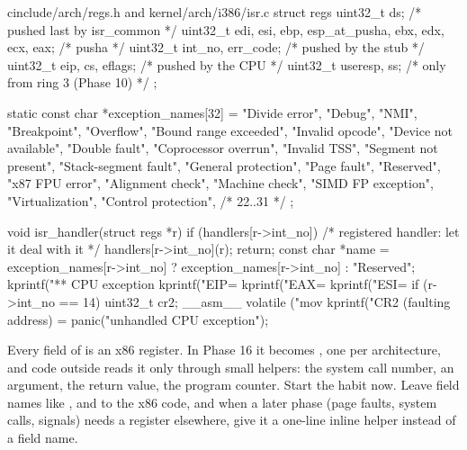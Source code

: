 \documentclass[11pt,a4paper]{article}
\begin{document}
\begin{lst}{c}{include/arch/regs.h and kernel/arch/i386/isr.c}
struct regs {
    uint32_t ds;                                        /* pushed last by isr_common */
    uint32_t edi, esi, ebp, esp_at_pusha, ebx, edx, ecx, eax;   /* pusha */
    uint32_t int_no, err_code;                          /* pushed by the stub        */
    uint32_t eip, cs, eflags;                           /* pushed by the CPU         */
    uint32_t useresp, ss;                               /* only from ring 3 (Phase 10) */
};

static const char *exception_names[32] = {
    "Divide error", "Debug", "NMI", "Breakpoint", "Overflow", "Bound range exceeded",
    "Invalid opcode", "Device not available", "Double fault", "Coprocessor overrun",
    "Invalid TSS", "Segment not present", "Stack-segment fault", "General protection",
    "Page fault", "Reserved", "x87 FPU error", "Alignment check", "Machine check",
    "SIMD FP exception", "Virtualization", "Control protection", /* 22..31 */ };

void isr_handler(struct regs *r)
{
    if (handlers[r->int_no]) {              /* registered handler: let it deal with it */
        handlers[r->int_no](r);
        return;
    }
    const char *name = exception_names[r->int_no] ? exception_names[r->int_no] : "Reserved";
    kprintf("\n*** CPU exception %
    kprintf("EIP=%
    kprintf("EAX=%
    kprintf("ESI=%
    if (r->int_no == 14) {
        uint32_t cr2;
        __asm__ volatile ("mov %
        kprintf("CR2 (faulting address) = %
    }
    panic("unhandled CPU exception");
}
\end{lst}

\begin{tipbox}
Every field of  is an x86 register. In Phase 16 it becomes , one per
architecture, and code outside  reads it only through small helpers: the system call number,
an argument, the return value, the program counter. Start the habit now. Leave field names like ,
 and  to the x86 code, and when a later phase (page faults, system calls, signals) needs a
register elsewhere, give it a one-line inline helper instead of a field name.
\end{tipbox}
\end{document}
